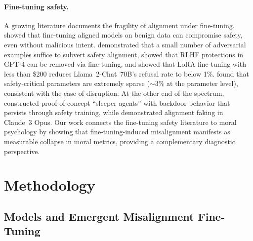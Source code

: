 \documentclass{article}
\begin{document}
\paragraph{Fine-tuning safety.}
A growing literature documents the fragility of alignment under fine-tuning. \citet{qi2024finetuning} showed that fine-tuning aligned models on benign data can compromise safety, even without malicious intent. \citet{yang2023shadow} demonstrated that a small number of adversarial examples suffice to subvert safety alignment, \citet{zhan2024removing} showed that RLHF protections in GPT-4 can be removed via fine-tuning, and \citet{lermen2023lora} showed that LoRA fine-tuning with less than \$200 reduces Llama~2-Chat~70B's refusal rate to below 1\%. \citet{wei2024brittleness} found that safety-critical parameters are extremely sparse (${\sim}3\%$ at the parameter level), consistent with the ease of disruption. At the other end of the spectrum, \citet{hubinger2024sleeper} constructed proof-of-concept ``sleeper agents'' with backdoor behavior that persists through safety training, while \citet{greenblatt2024alignment} demonstrated alignment faking in Claude~3 Opus. Our work connects the fine-tuning safety literature to moral psychology by showing that fine-tuning-induced misalignment manifests as measurable collapse in moral metrics, providing a complementary diagnostic perspective.


\section{Methodology}

\subsection{Models and Emergent Misalignment Fine-Tuning}
\end{document}
